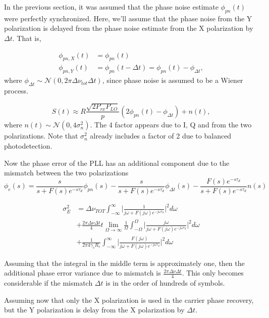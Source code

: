\documentclass[a4paper]{article}
\begin{document}
In the previous section, it was assumed that the phase noise estimate $\phi_{pn}(t)$ were perfectly synchronized. Here, we'll assume that the phase noise from the Y polarization is delayed from the phase noise estimate from the X polarization by $\Delta t$. That is,

\begin{align}
\phi_{pn, X}(t) &= \phi_{pn}(t) \\
\phi_{pn, Y}(t)& = \phi_{pn}(t-\Delta t) = \phi_{pn}(t) - \phi_{\Delta t},
\end{align}
where $\phi_{\Delta t} \sim \mathcal{N}(0, 2\pi\Delta\nu_{tot}\Delta t)$, since phase noise is assumed to be a Wiener process.

\begin{equation}
S(t) \approx R\frac{\sqrt{2P_{rx}P_{LO}}}{p}(2\phi_{pn}(t) - \phi_{\Delta t}) + n(t),
\end{equation}
where $n(t) \sim\mathcal{N}(0, 4\sigma_n^2)$. The 4 factor appears due to I, Q and from the two polarizations. Note that $\sigma_n^2$ already includes a factor of 2 due to balanced photodetection. 

Now the phase error of the PLL has an additional component due to the mismatch between the two polarizations
\begin{equation}
\phi_e(s) = \frac{s}{s + F(s)e^{-s\tau_d}}\phi_{pn}(s) - \frac{s}{s + F(s)e^{-s\tau_d}}\phi_{\Delta t}(s) - \frac{F(s)e^{-s\tau_d}}{s + F(s)e^{-s\tau_d}}n(s)
\end{equation}

\begin{align} \nonumber
\sigma_E^2 &= \Delta\nu_{TOT}\int_{-\infty}^\infty \bigg|\frac{1}{j\omega +  F(j\omega)e^{-j\omega\tau_d}}\bigg|^2d\omega \\
& + \frac{2\pi\Delta\nu\Delta t}{4} t\lim_{\Omega\to\infty}\frac{1}{\Omega}\int_{-\Omega}^\Omega \bigg|\frac{j\omega}{j\omega +  F(j\omega)e^{-j\omega\tau_d}}\bigg|^2d\omega \\
&+ \frac{1}{2\pi 4\gamma_sR_s}\int_{-\infty}^\infty \bigg|\frac{F(j\omega)}{j\omega + F(j\omega)e^{-j\omega\tau_d}}\bigg|^2d\omega \nonumber
\end{align}

Assuming that the integral in the middle term is approximately one, then the additional phase error variance due to mismatch is $\frac{2\pi\Delta\nu\Delta t}{4}$. This only becomes considerable if the mismatch $\Delta t$ is in the order of hundreds of symbols.

Assuming now that only the X polarization is used in the carrier phase recovery, but the Y polarization is delay from the X polarization by $\Delta t$.
\end{document}
